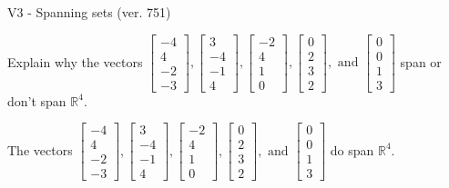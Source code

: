 \begin{exercise}
  \begin{exerciseTitle}V3 - Spanning sets (ver. 751)\end{exerciseTitle}
  \begin{exerciseStatement}
    Explain why the vectors \(\left[\begin{array}{r}
-4 \\
4 \\
-2 \\
-3
\end{array}\right] , \left[\begin{array}{r}
3 \\
-4 \\
-1 \\
4
\end{array}\right] , \left[\begin{array}{r}
-2 \\
4 \\
1 \\
0
\end{array}\right] , \left[\begin{array}{r}
0 \\
2 \\
3 \\
2
\end{array}\right] , \text{ and } \left[\begin{array}{r}
0 \\
0 \\
1 \\
3
\end{array}\right]\) span or don't span \(\mathbb{R}^4\). 
	


  \end{exerciseStatement}
  \begin{exerciseAnswer}
   The vectors \(\left[\begin{array}{r}
-4 \\
4 \\
-2 \\
-3
\end{array}\right] , \left[\begin{array}{r}
3 \\
-4 \\
-1 \\
4
\end{array}\right] , \left[\begin{array}{r}
-2 \\
4 \\
1 \\
0
\end{array}\right] , \left[\begin{array}{r}
0 \\
2 \\
3 \\
2
\end{array}\right] , \text{ and } \left[\begin{array}{r}
0 \\
0 \\
1 \\
3
\end{array}\right]\) 
  	 do  
	span \(\mathbb{R}^4\).
  


  \end{exerciseAnswer}
\end{exercise}